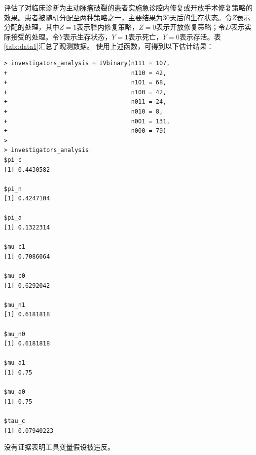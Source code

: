 \begin{example}\label{eg::1-iv-inequalities}
\citet{improve2014endovascular}评估了对临床诊断为主动脉瘤破裂的患者实施急诊腔内修复或开放手术修复策略的效果。患者被随机分配至两种策略之一，主要结果为30天后的生存状态。令$Z$表示分配的处理，其中$Z=1$表示腔内修复策略，$Z=0$表示开放修复策略；令$D$表示实际接受的处理。令$Y$表示生存状态，$Y=1$表示死亡，$Y=0$表示存活。表\ref{tab::data1}汇总了观测数据。
使用上述函数，可得到以下估计结果：
\begin{lstlisting}
> investigators_analysis = IVbinary(n111 = 107,
+                                   n110 = 42,
+                                   n101 = 68,
+                                   n100 = 42,
+                                   n011 = 24,
+                                   n010 = 8,
+                                   n001 = 131,
+                                   n000 = 79)
>                         
> investigators_analysis
$pi_c
[1] 0.4430582

$pi_n
[1] 0.4247104

$pi_a
[1] 0.1322314

$mu_c1
[1] 0.7086064

$mu_c0
[1] 0.6292042

$mu_n1
[1] 0.6181818

$mu_n0
[1] 0.6181818

$mu_a1
[1] 0.75

$mu_a0
[1] 0.75

$tau_c
[1] 0.07940223
\end{lstlisting}
没有证据表明工具变量假设被违反。 
\end{example}


